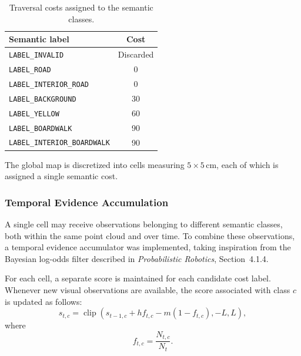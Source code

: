 \documentclass[a4paper,11pt,oneside]{book}
\begin{document}
\begin{table}[H]
    \centering
    \begin{tabular}{lc}
        \toprule
        \textbf{Semantic label} & \textbf{Cost} \\
        \midrule
        \texttt{LABEL\_INVALID}            & Discarded \\
        \texttt{LABEL\_ROAD}               & 0 \\
        \texttt{LABEL\_INTERIOR\_ROAD}      & 0 \\
        \texttt{LABEL\_BACKGROUND}         & 30 \\
        \texttt{LABEL\_YELLOW}             & 60 \\
        \texttt{LABEL\_BOARDWALK}          & 90 \\
        \texttt{LABEL\_INTERIOR\_BOARDWALK} & 90 \\
        \bottomrule
    \end{tabular}
    \caption{Traversal costs assigned to the semantic classes.}
    \label{tab:semantic_costs}
\end{table}

The global map is discretized into cells measuring
$5 \times 5\,\mathrm{cm}$, each of which is assigned a single
semantic cost.

\subsubsection{Temporal Evidence Accumulation}

A single cell may receive observations belonging to different
semantic classes, both within the same point cloud and over time.
To combine these observations, a temporal evidence accumulator
was implemented, taking inspiration from the Bayesian log-odds
filter described in \textit{Probabilistic Robotics},
Section~4.1.4.

For each cell, a separate score is maintained for each candidate
cost label. Whenever new visual observations are available,
the score associated with class $c$ is updated as follows:
\begin{equation}
    s_{t,c}
    =
    \operatorname{clip}
    \left(
        s_{t-1,c}
        + h f_{t,c}
        - m\left(1-f_{t,c}\right),
        -L,
        L
    \right),
    \label{eq:semantic_score_update}
\end{equation}
where
\begin{equation}
    f_{t,c}
    =
    \frac{N_{t,c}}{N_t}.
    \label{eq:semantic_class_fraction}
\end{equation}
\end{document}

